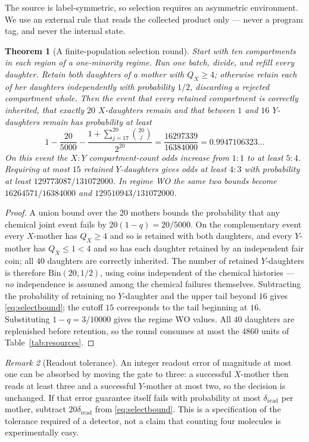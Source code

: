 \documentclass[11pt,a4paper]{article}
\theoremstyle{plain}
\newtheorem{theorem}{Theorem}[section]
\theoremstyle{definition}
\theoremstyle{remark}
\newtheorem{remark}[theorem]{Remark}
\newcommand{\Bin}{\mathrm{Bin}}
\begin{document}
The source is label-symmetric, so selection requires an asymmetric environment. We use an
external rule that reads the collected product only --- never a program tag, and never the
internal state.

\begin{theorem}[A finite-population selection round]\label{thm:selection}
Start with ten compartments in each region of a one-minority regime. Run one batch,
divide, and refill every daughter. Retain both daughters of a mother with $Q_X\ge4$;
otherwise retain each of her daughters independently with probability $1/2$, discarding a
rejected compartment whole. Then the event that every retained compartment is correctly
inherited, that exactly $20$ $X$-daughters remain and that between $1$ and $16$
$Y$-daughters remain has probability at least
\begin{equation}
1-\frac{20}{5000}-\frac{1+\sum_{j=17}^{20}\binom{20}{j}}{2^{20}}
=\frac{16297339}{16384000}=0.9947106323\ldots\label{eq:selectbound}
\end{equation}
On this event the $X:Y$ compartment-count odds increase from $1:1$ to at least $5:4$.
Requiring at most $15$ retained $Y$-daughters gives odds at least $4:3$ with probability
at least $129773087/131072000$. In regime WO the same two bounds become
$16264571/16384000$ and $129510943/131072000$.
\end{theorem}

\begin{proof}
A union bound over the $20$ mothers bounds the probability that any chemical joint event
fails by $20(1-q)=20/5000$. On the complementary event every $X$-mother has $Q_X\ge4$ and
so is retained with both daughters, and every $Y$-mother has $Q_X\le1<4$ and so has each
daughter retained by an independent fair coin; all $40$ daughters are correctly
inherited. The number of retained $Y$-daughters is therefore $\Bin(20,1/2)$, using coins
independent of the chemical histories --- \emph{no} independence is assumed among the
chemical failures themselves. Subtracting the probability of retaining no $Y$-daughter
and the upper tail beyond $16$ gives \eqref{eq:selectbound}; the cutoff $15$ corresponds
to the tail beginning at $16$. Substituting $1-q=3/10000$ gives the regime WO values.
All $40$ daughters are replenished before retention, so the round consumes at most the
$4860$ units of Table~\ref{tab:resources}.
\end{proof}

\begin{remark}[Readout tolerance]
An integer readout error of magnitude at most one can be absorbed by moving the gate to
three: a successful $X$-mother then reads at least three and a successful $Y$-mother at
most two, so the decision is unchanged. If that error guarantee itself fails with
probability at most $\delta_{\mathrm{read}}$ per mother, subtract $20\delta_{\mathrm{read}}$
from \eqref{eq:selectbound}. This is a specification of the tolerance required of a
detector, not a claim that counting four molecules is experimentally easy.
\end{remark}
\end{document}
